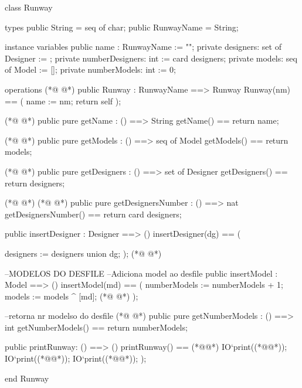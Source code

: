 \begin{vdmpp}[breaklines=true]
class Runway

types
 public String = seq of char;
 public RunwayName = String;
 
instance variables
 public  name : RunwayName := "";
 private designers: set of Designer := {};
 private numberDesigners: int := card designers;
 private models: seq of Model := [];
 private numberModels: int := 0;
 
 operations
(*@
\label{Runway:15}
@*)
 public Runway : 
         RunwayName 
          ==> Runway
  Runway(nm) == (
  name := nm;
  return self
 );
 
(*@
\label{getName:23}
@*)
 public pure getName : () ==> String
    getName() == return name;
  
(*@
\label{getModels:26}
@*)
 public pure getModels : () ==> seq of Model
     getModels() == return models;
     
(*@
\label{getDesigners:29}
@*)
 public pure getDesigners : () ==> set of Designer
     getDesigners() == return designers;  
 
(*@
\label{insertDesigner:32}
@*)
(*@
\label{getDesignersNumber:32}
@*)
 public pure getDesignersNumber : () ==> nat
     getDesignersNumber() == return card designers;  
         
 public insertDesigner : Designer ==> ()
  insertDesigner(dg) ==
  (
   
    designers := designers union  {dg};
  );
(*@
\label{insertModel:41}
@*)
  
  --MODELOS DO DESFILE
  --Adiciona model ao desfile
 public insertModel : Model ==> ()
  insertModel(md) ==
  (
    numberModels := numberModels + 1;
    models := models ^  [md];
(*@
\label{getNumberModels:49}
@*)
  );
  
  --retorna nr modelso do desfile
(*@
\label{printRunway:52}
@*)
  public pure getNumberModels : () ==> int
  getNumberModels() == return numberModels;
  
   public printRunway: () ==> ()
  printRunway() == (*@\vdmnotcovered{(}@*)
    IO`print((*@@*));
   IO`print((*@@*));
   IO`print((*@@*));
  );
  
end Runway
\end{vdmpp}
\bigskip
